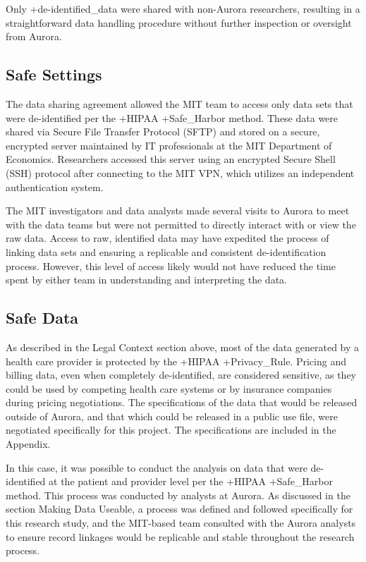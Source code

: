 \documentclass[
]{book}
\begin{document}
Only +de-identified\_data\textbar{} were shared with non-Aurora researchers, resulting in a straightforward data handling procedure without further inspection or oversight from Aurora.

\hypertarget{safe-settings-4}{%
\subsection{Safe Settings}\label{safe-settings-4}}

The data sharing agreement allowed the MIT team to access only data sets that were de-identified per the +HIPAA\textbar{} +Safe\_Harbor\textbar{} method. These data were shared via Secure File Transfer Protocol (SFTP) and stored on a secure, encrypted server maintained by IT professionals at the MIT Department of Economics. Researchers accessed this server using an encrypted Secure Shell (SSH) protocol after connecting to the MIT VPN, which utilizes an independent authentication system.

The MIT investigators and data analysts made several visits to Aurora to meet with the data teams but were not permitted to directly interact with or view the raw data. Access to raw, identified data may have expedited the process of linking data sets and ensuring a replicable and consistent de-identification process. However, this level of access likely would not have reduced the time spent by either team in understanding and interpreting the data.

\hypertarget{safe-data-4}{%
\subsection{Safe Data}\label{safe-data-4}}

As described in the Legal Context section above, most of the data generated by a health care provider is protected by the +HIPAA\textbar{} +Privacy\_Rule\textbar. Pricing and billing data, even when completely de-identified, are considered sensitive, as they could be used by competing health care systems or by insurance companies during pricing negotiations. The specifications of the data that would be released outside of Aurora, and that which could be released in a public use file, were negotiated specifically for this project. The specifications are included in the Appendix.

In this case, it was possible to conduct the analysis on data that were de-identified at the patient and provider level per the +HIPAA\textbar{} +Safe\_Harbor\textbar{} method. This process was conducted by analysts at Aurora. As discussed in the section Making Data Useable, a process was defined and followed specifically for this research study, and the MIT-based team consulted with the Aurora analysts to ensure record linkages would be replicable and stable throughout the research process.
\end{document}
